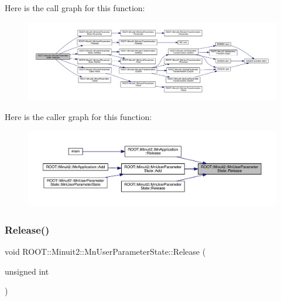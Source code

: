 Here is the call graph for this function\+:
\nopagebreak
\begin{figure}[H]
\begin{center}
\leavevmode
\includegraphics[width=350pt]{d3/de0/classROOT_1_1Minuit2_1_1MnUserParameterState_a7dd23afe69aaab961b536e2cdc75d66e_cgraph}
\end{center}
\end{figure}
Here is the caller graph for this function\+:
\nopagebreak
\begin{figure}[H]
\begin{center}
\leavevmode
\includegraphics[width=350pt]{d3/de0/classROOT_1_1Minuit2_1_1MnUserParameterState_a7dd23afe69aaab961b536e2cdc75d66e_icgraph}
\end{center}
\end{figure}
\mbox{\label{classROOT_1_1Minuit2_1_1MnUserParameterState_a7dd23afe69aaab961b536e2cdc75d66e}} 
\subsubsection{\texorpdfstring{Release()}{Release()}\hspace{0.1cm}{\footnotesize\ttfamily [3/6]}}
{\footnotesize\ttfamily void R\+O\+O\+T\+::\+Minuit2\+::\+Mn\+User\+Parameter\+State\+::\+Release (\begin{DoxyParamCaption}\item[{unsigned int}]{ }\end{DoxyParamCaption})}

